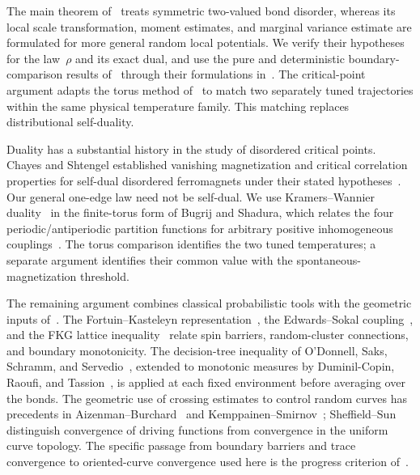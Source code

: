 The main theorem of~\cite{R} treats symmetric two-valued bond disorder,
whereas its local scale transformation, moment estimates, and marginal
variance estimate are formulated for more general random local potentials.
We verify their hypotheses for the law~$\rho$ and its exact dual, and use
the pure and deterministic boundary-comparison results of~\cite{S}
through their formulations in~\cite{R}. The critical-point argument
adapts the torus method of~\cite[Section~8]{R} to match two separately
tuned trajectories within the same physical temperature family.
This matching replaces distributional self-duality.

Duality has a substantial history in the study of disordered critical
points. Chayes and Shtengel established vanishing magnetization and
critical correlation properties for self-dual disordered ferromagnets
under their stated hypotheses~\cite[Theorems~$1'$--$2'$]{ChayesShtengel}.
Our general one-edge law need not be self-dual. We use Kramers--Wannier
duality~\cite{KW} in the finite-torus form of Bugrij and Shadura, which
relates the four periodic/antiperiodic partition functions for arbitrary
positive inhomogeneous couplings~\cite[Equations~(4)--(5)]{BS}.
The torus comparison identifies the two tuned temperatures; a separate
argument identifies their common value with the spontaneous-magnetization
threshold.

The remaining argument combines classical probabilistic tools with
the geometric inputs of~\cite{R,S}. The Fortuin--Kasteleyn representation~\cite{FK}, the
Edwards--Sokal coupling~\cite{ES}, and the FKG lattice
inequality~\cite{FKG} relate spin barriers, random-cluster connections,
and boundary monotonicity. The decision-tree inequality of O'Donnell,
Saks, Schramm, and Servedio~\cite{OSSS}, extended to monotonic measures
by Duminil-Copin, Raoufi, and Tassion~\cite[Theorem~1.1]{DCRT}, is
applied at each fixed environment before averaging over the bonds.
The geometric use of crossing estimates to control random curves has
precedents in Aizenman--Burchard~\cite{AB} and
Kemppainen--Smirnov~\cite{KS}; Sheffield--Sun~\cite{SS} distinguish
convergence of driving functions from convergence in the uniform curve
topology. The specific passage from boundary barriers and trace
convergence to oriented-curve convergence used here is the progress
criterion of~\cite[Section~9]{R}.
